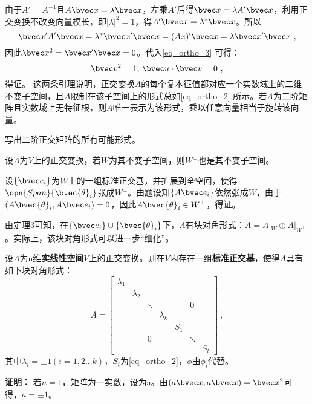 由于$A'=A^{-1}$且$A\bvec x=\lambda \bvec x$，左乘$A'$后得$\bvec x=\lambda A'\bvec x$，利用正交变换不改变向量模长，即$|\lambda|^2=1$，得$A'\bvec x=\lambda^*\bvec x$。所以
\begin{equation}
\bvec x'A'\bvec x=\lambda^* \bvec x'\bvec x=(Ax)'\bvec x=\lambda \bvec x'\bvec x~,
\end{equation}
因此$\bvec x^2=\bvec x'\bvec x=0$。代入\autoref{eq_ortho_3} 可得：
\begin{equation}
\bvec v^2=1,\,\bvec u\cdot \bvec v=0~,
\end{equation}
得证。
这两条引理说明，正交变换$A$的每个复本征值都对应一个实数域上的二维不变子空间，且$A$限制在该子空间上的形式总如\autoref{eq_ortho_2} 所示。若$A$为二阶矩阵且实数域上无特征根，则$A$唯一表示为该形式，乘以任意向量相当于旋转该向量。
\begin{exercise}{}
写出二阶正交矩阵的所有可能形式。
\end{exercise}
\begin{lemma}{}\label{lem_ortho_2}
设$A$为$V$上的正交变换，若$W$为其不变子空间，则$W^{\bot}$也是其不变子空间。
\end{lemma}
设$\{\bvec e_i\}$为$W$上的一组标准正交基，并扩展到全空间，使得$\opn{Span}\{\bvec {\theta}_i\}$张成$W^{\bot}$。由题设知$\{A\bvec e_i\}$依然张成$W$，由于$(A\bvec {\theta}_i,A\bvec e_i)=0$，因此$A\bvec{\theta}_i\in W^{\bot}$，得证。

由定理3可知，在$\{\bvec e_i\}\cup\{\bvec {\theta}_i\}$下，$A$有块对角形式：$A=A|_W\oplus A|_{W^{\bot}}$。实际上，该块对角形式可以进一步“细化”。
\begin{theorem}{}
设$A$为n维\textbf{实线性空间}$V$上的正交变换。则在$V$内存在一组\textbf{标准正交基}，使得$A$具有如下块对角形式：
\begin{equation}
A=\left[\begin{array}{lllllll}
\lambda_1 & & & & & & \\
& \lambda_2 & & & & & \\
& & \ddots & & & 0 & \\
& & & \lambda_k & & & \\
& & & & S_1 & & \\
& & 0 & & & \ddots & \\
& & & & & & S_l
\end{array}\right]~,
\end{equation}
其中$\lambda_i=\pm 1(i=1,2...k)$，$S_i$为\autoref{eq_ortho_2}，$\phi$由$\phi_i$代替。
\end{theorem}
\textbf{证明：}
若$n=1$，矩阵为一实数，设为a。由$(a\bvec x,a\bvec x)=\bvec x^2$可得，$a=\pm 1$。

